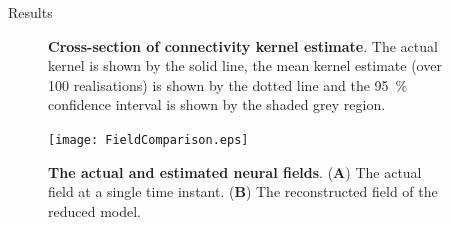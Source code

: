 \documentclass[final]{beamer}
\newlength{\sepwid}
\newlength{\onecolwid}
\begin{document}
\begin{frame}[t]
\begin{columns}[t]
\begin{column}{\onecolwid}
\begin{block}{Results}
\begin{figure}
\begin{center}
		\end{center}
		\caption{{\bf Cross-section of connectivity kernel estimate}. The actual kernel is shown by the solid line, the mean kernel estimate (over 100 realisations) is shown by the dotted line and the 95~\% confidence interval is shown by the shaded grey region.}
		\label{fig:Figure8}
		\end{figure}				
		\begin{figure}
		\begin{center}
		\texttt{[image: FieldComparison.eps]}
		\end{center}
		\caption{{\bf The actual and estimated neural fields}. (\textbf{A}) The actual field at a single time instant. (\textbf{B}) The reconstructed field of the reduced model.}
		\label{fig:Figure10}
		\end{figure}
		
	\end{block}
\end{column}

	\begin{column}{\sepwid}\end{column}			%

 \end{columns}
\end{frame}
\end{document}
